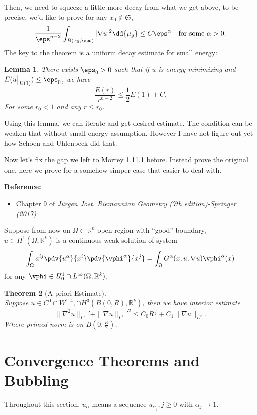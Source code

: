 \documentclass[UTF8,12pt]{article}
\theoremstyle{plain}\newtheorem{theorem}{Theorem}
\theoremstyle{definition}\newtheorem{definition}[theorem]{Definition}
\theoremstyle{definition}\newtheorem{example}[theorem]{Example}
\theoremstyle{plain}\newtheorem{axiom}[theorem]{Axiom}
\theoremstyle{plain}\newtheorem{assertion}[theorem]{Assertion}
\theoremstyle{plain}\newtheorem{corollary}[theorem]{Corollary}
\theoremstyle{plain}\newtheorem{lemma}[theorem]{Lemma}
\theoremstyle{plain}\newtheorem{proposition}[theorem]{Proposition}
\theoremstyle{plain}\newtheorem{prop}[theorem]{Proposition}
\theoremstyle{plain}\newtheorem{conjecture}[theorem]{Conjecture}
\theoremstyle{plain}\newtheorem{conj}[theorem]{Conjecture}
\theoremstyle{plain}\newtheorem{problem}[theorem]{Problem}
\theoremstyle{remark}\newtheorem{notation}[theorem]{Notation}
\theoremstyle{definition}\newtheorem*{question}{Question}
\theoremstyle{definition}\newtheorem*{answer}{Answer}
\theoremstyle{definition}\newtheorem*{goal}{Goal}
\theoremstyle{plain}\newtheorem*{application}{Application}
\theoremstyle{plain}\newtheorem*{exercise}{Exercise}
\theoremstyle{remark}\newtheorem*{remark}{Remark}
\theoremstyle{remark}\newtheorem*{note}{\small{Note}}
\numberwithin{equation}{section}
\numberwithin{theorem}{section}
\numberwithin{figure}{section}
\begin{document}
Then, we need to squeeze a little more decay from what we get above, to be precise,
we'd like to prove for any \(x_0\notin \mathfrak{S}\), \[
    \frac{1}{\eps^{n-2}}\int_{B(x_0,\eps)}|\nabla u|^2\dd{\mu_g}\le C\eps^{\alpha}
    \quad\text{for some }\alpha>0
.\] The key to the theorem is a uniform decay estimate for small energy:
\begin{lemma}
    There exists \(\eps_0>0\) such that if \(u\) is energy minimizing and 
    \(E(u\big|_{D(1)})\le \eps_0\), we have \[
        \frac{E(r)}{r^{n-2}}\le \frac{1}{2}E(1)+C
    .\] For some \(r_0<1\) and any \(r\le r_0\).
\end{lemma}
Using this lemma, we can iterate and get desired estimate. The condition can be
weaken that without small energy assumption. However I have not figure out yet how
Schoen and Uhlenbeck did that.


Now let's fix the gap we left to Morrey 1.11.1 before. Instead prove the original one,
here we prove for a somehow simper case that easier to deal with.

\noindent\textbf{Reference:}
\begin{itemize}
    \item Chapter 9 of \itshape{}
    J\"urgen Jost. Riemannian Geometry (7th edition)-Springer (2017)
\end{itemize}

Suppose from now on \(\Omega\subset\mathbb{R}^n\) open region with ``good'' boundary,
\(u\in H^1(\Omega,\mathbb{R}^k)\) is a continuous weak solution of system \[
    \int_{\Omega}a^{ij}\pdv{u^{\alpha}}{x^i}\pdv{\vphi^{\alpha}}{x^j}
    =\int_{\Omega}G^{\alpha}(x,u,\nabla u)\vphi^\alpha(x)
\] for any \(\vphi\in H_0^1\cap L^\infty(\Omega,\mathbb{R}^k)\).

\begin{theorem}[A priori Estimate]\hfill\\
    Suppose \(u\in C^0\cap W^{1,4},\cap H^3(B(0,R),\mathbb{R}^k)\), then we have
    interior estimate \[
        \|\nabla^2 u\|_{L^2}'+\|\nabla u\|_{L^4}'^2
        \le C_0R^{\frac{n}{2}}+C_1\|\nabla u\|_{L^2}
    .\] Where primed norm is on \(B(0,\frac{R}{2})\).
\end{theorem}

\section{Convergence Theorems and Bubbling}
Throughout this section, \(u_\alpha\) means a sequence \(u_{\alpha_j},j\ge 0\) with
\(\alpha_j\to 1\).
\end{document}

